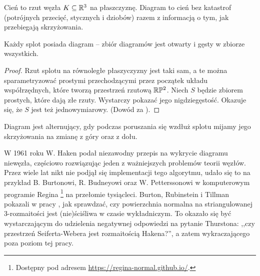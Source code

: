 \begin{definition} \label{def_diagrams}
	Cień to rzut węzła $K \subseteq \mathbb R^3$ na płaszczyznę.
	Diagram to cień bez katastrof
	(potrójnych przecięć, stycznych i dziobów)
	razem z informacją o tym, jak przebiegają skrzyżowania.
\end{definition}

\begin{proposition}
	Każdy splot posiada diagram -- zbiór diagramów jest otwarty i gęsty w zbiorze wszystkich.
\end{proposition}

\begin{proof}
	Rzut splotu na równoległe płaszyczyzny jest taki sam,
	a te można sparametryzować prostymi przechodzącymi przez początek układu współrzędnych,
	które tworzą przestrzeń rzutową $\mathbb R \mathbb P^2$.
	Niech $S$ będzie zbiorem prostych, które dają złe rzuty.
	Wystarczy pokazać jego nigdziegęstość.
	Okazuje się, że $S$ jest też jednowymiarowy.
	(Dowód za \cite{crowell63}).
\end{proof}

\begin{definition}
	Diagram jest alternujący,
	gdy podczas poruszania się wzdłuż splotu
	mijamy jego skrzyżowania na zmianę z góry oraz z dołu.
\end{definition}


W 1961 roku W. Haken \cite{haken61} podał niezawodny przepis na wykrycie diagramu niewęzła,
częściowo rozwiązując jeden z ważniejszych problemów teorii węzłów.
Przez wiele lat nikt nie podjął się implementacji tego algorytmu,
udało się to na przykład B. Burtonowi, R. Budneyowi oraz W. Petterssonowi w komputerowym programie Regina
\footnote{Dostępny pod adresem \url{https://regina-normal.github.io/}.} na przełomie tysiącleci.
Burton, Rubinstein i Tillman pokazali w pracy \cite{burton12}, jak sprawdzać,
czy powierzchnia normalna na striangulowanej 3-rozmaitości jest (nie)ściśliwa w czasie wykładniczym.
To okazało się być wystarczającym do udzielenia negatywnej odpowiedzi na pytanie Thurstona:
,,czy przestrzeń Seiferta-Webera jest rozmaitością Hakena?'',
a zatem wykraczającego poza poziom tej pracy.


